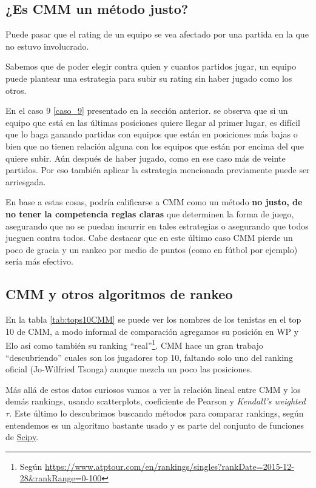 \subsection{¿Es CMM un método justo?}

Puede pasar que el rating de un equipo se vea afectado por una partida en la que no estuvo involucrado.

Sabemos que de poder elegir contra quien y cuantos partidos jugar, un equipo puede plantear una estrategia para subir su rating sin haber jugado como los otros.

En el caso 9 \ref{caso_9} presentado en la sección anterior. se observa que si un equipo que está en las últimas posiciones quiere llegar al primer lugar, es difícil que lo haga ganando partidas con equipos que están en posiciones más bajas o bien que no tienen relación alguna con los equipos que están por encima del que quiere subir. Aún después de haber jugado, como en ese caso más de veinte partidos. Por eso también aplicar la estrategia mencionada previamente puede ser arriesgada.

En base a estas cosas, podría calificarse a CMM como un método \textbf{no  justo, de no tener la competencia reglas claras} que determinen la forma de juego, asegurando que no se puedan incurrir en tales estrategias o asegurando que todos jueguen contra todos. Cabe destacar que en este último caso CMM pierde un poco de gracia y un rankeo por medio de puntos (como en fútbol por ejemplo) sería más efectivo.

\FloatBarrier
\subsection{CMM y otros algoritmos de rankeo}\label{cmm_comparacion}
En la tabla \ref{tab:tops10CMM} se puede ver los nombres de los tenistas en el top 10 de CMM, a modo informal de comparación agregamos su posición en WP y Elo así como también su ranking ``real''\footnote{Según \url{https://www.atptour.com/en/rankings/singles?rankDate=2015-12-28&rankRange=0-100}}. CMM hace un gran trabajo ``descubriendo'' cuales son los jugadores top 10, faltando solo uno del ranking oficial (Jo-Wilfried Tsonga) aunque mezcla un poco las posiciones.



Más allá de estos datos curiosos vamos a ver la relación lineal entre CMM y los demás rankings, usando scatterplots, coeficiente de Pearson y \textit{Kendall’s weighted $\tau$}. Este último lo descubrimos buscando métodos para comparar rankings, según entendemos es un algoritmo bastante usado y es parte del conjunto de funciones de \href{https://docs.scipy.org/doc/scipy/reference/generated/scipy.stats.weightedtau.html}{Scipy}.

